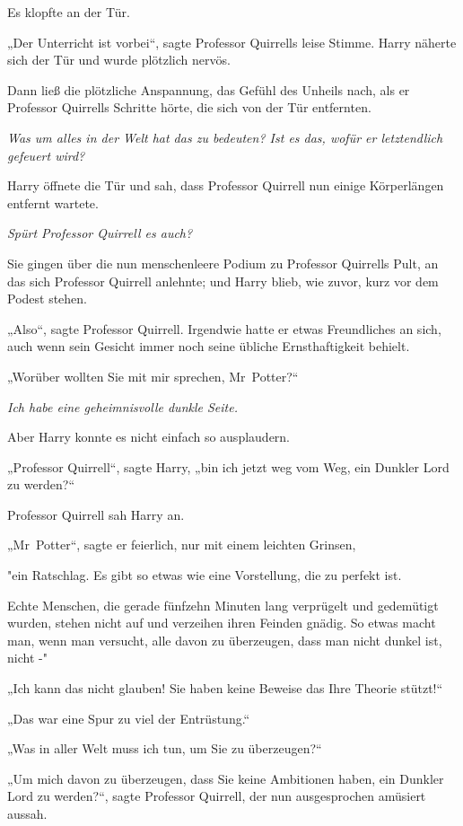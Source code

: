 {Es klopfte an der Tür.

„Der Unterricht ist vorbei“, sagte Professor Quirrells leise Stimme. Harry näherte sich der Tür und wurde plötzlich nervös.

Dann ließ die plötzliche Anspannung, das Gefühl des Unheils nach, als er Professor Quirrells Schritte hörte, die sich von der Tür entfernten.

\emph{Was um alles in der Welt hat das zu bedeuten? Ist es das, wofür er letztendlich gefeuert wird?}

Harry öffnete die Tür und sah, dass Professor Quirrell nun einige Körperlängen entfernt wartete.

\emph{Spürt Professor Quirrell es auch?}

Sie gingen über die nun menschenleere Podium zu Professor Quirrells Pult, an das sich Professor Quirrell anlehnte; und Harry blieb, wie zuvor, kurz vor dem Podest stehen.

„Also“, sagte Professor Quirrell. Irgendwie hatte er etwas Freundliches an sich, auch wenn sein Gesicht immer noch seine übliche Ernsthaftigkeit behielt.

„Worüber wollten Sie mit mir sprechen, Mr~Potter?“

\emph{Ich habe eine geheimnisvolle dunkle Seite.}

Aber Harry konnte es nicht einfach so ausplaudern.

„Professor Quirrell“, sagte Harry, „bin ich jetzt weg vom Weg, ein Dunkler Lord zu werden?“

Professor Quirrell sah Harry an.

„Mr~Potter“, sagte er feierlich, nur mit einem leichten Grinsen,

"ein Ratschlag. Es gibt so etwas wie eine Vorstellung, die zu perfekt ist.

Echte Menschen, die gerade fünfzehn Minuten lang verprügelt und gedemütigt wurden, stehen nicht auf und verzeihen ihren Feinden gnädig. So etwas macht man, wenn man versucht, alle davon zu überzeugen, dass man nicht dunkel ist, nicht -"

„Ich kann das nicht glauben! Sie haben keine Beweise das Ihre Theorie stützt!“

„Das war eine Spur zu viel der Entrüstung.“

„Was in aller Welt muss ich tun, um Sie zu überzeugen?“

„Um mich davon zu überzeugen, dass Sie keine Ambitionen haben, ein Dunkler Lord zu werden?“, sagte Professor Quirrell, der nun ausgesprochen amüsiert aussah.

}
